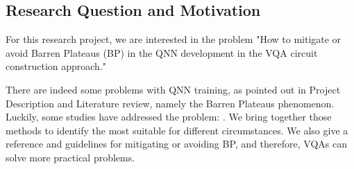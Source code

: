 \subsection{Research Question and Motivation}
For this research project, we are interested in the problem "How to mitigate or avoid Barren Plateaus (BP) in the QNN development in the VQA circuit construction approach."

There are indeed some problems with QNN training, as pointed out in Project Description and Literature review, namely the Barren Plateaus phenomenon.
Luckily, some studies have addressed the problem: \cite{pesahAbsenceBarrenPlateaus2021,pattiEntanglementDevisedBarren2021,liuParameterInitializationMethod2021}.
We bring together those methods to identify the most suitable for different circumstances.
We also give a reference and guidelines for mitigating or avoiding BP, and therefore, VQAs can solve more practical problems.
